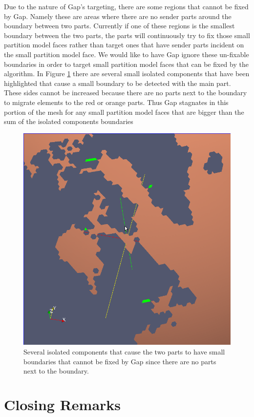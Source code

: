 \documentclass{thesis}
\begin{document}
Due to the nature of Gap's targeting, there are some regions that cannot be 
fixed by Gap. Namely these are areas where there are no sender parts around 
the boundary between two parts. Currently if one of these regions is the 
smallest boundary between the two parts, the parts will continuously try to fix 
those small partition model faces rather than target ones that have sender 
parts incident on the small partition model face. We would like to have Gap 
ignore these un-fixable boundaries in order to target small partition model 
faces that can be fixed by the algorithm. In Figure \ref{fig:ocean} there are 
several small isolated components that have been highlighted that cause a 
small boundary to be detected with the main part. These sides cannot be 
increased because there are no parts next to the boundary to migrate elements 
to the red or orange parts. Thus Gap stagnates in this portion of the mesh 
for any small partition model faces that are bigger than the sum of the 
isolated components boundaries 

\begin{figure} [!ht]
\centering
\captionsetup{justification=centering,margin=1cm}
\includegraphics[width=.65\textwidth]{Ocean_Isolated.png}
\caption{\label{fig:ocean} \textnormal{Several isolated components that cause the two parts to have small boundaries that cannot be fixed by Gap since there are no parts next to the boundary.}}
\end{figure}


\chapter{Closing Remarks}
\end{document}
